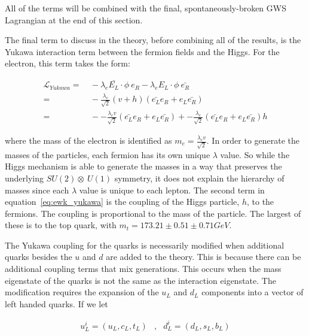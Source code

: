 \noindent All of the terms will be combined with the final,
spontaneously-broken GWS Lagrangian at the end of this section.  

\par The final term to discuss in the theory, before combining all of
the results, is the Yukawa interaction term between the fermion fields
and the Higgs.  For the electron, this term takes the form:

\begin{equation}\label{eq:ewk_yukawa}
\begin{aligned}
\mathcal{L}_{Yukawa} =&~ -\lambda_{e}\bar{E_{L}}\cdot\phi~e_{R} -
\lambda_{e}E_{L}\cdot\phi~\bar{e_{R}} \\
=&~ -\frac{\lambda_{e}}{\sqrt{2}}(v+h)(\bar{e_{L}}e_{R} +
  e_{L}\bar{e_{R}}) \\
=&~ --\frac{\lambda_{e}v}{\sqrt{2}}(\bar{e_{L}}e_{R} +
  e_{L}\bar{e_{R}}) + -\frac{\lambda_{e}}{\sqrt{2}}(\bar{e_{L}}e_{R} +
  e_{L}\bar{e_{R}})h
\end{aligned}
\end{equation}

\noindent where the mass of the electron is identified as $m_{e} =
\frac{\lambda_{e}v}{\sqrt{2}}$.  In order to generate the masses of
the particles, each fermion has its own unique $\lambda$ value.  So
while the Higgs mechanism is able to generate the masses in a way that
preserves the underlying $SU(2)\otimes~U(1)$ symmetry, it does not
explain the hierarchy of masses since each $\lambda$ value is unique
to each lepton.  The second term in equation~\ref{eq:ewk_yukawa} is
the coupling of the Higgs particle, $h$, to the fermions.  The
coupling is proportional to the mass of the particle.  The largest of
these is to the top quark, with $m_{t} = 173.21 \pm 0.51 \pm 0.71 GeV$.

\par The Yukawa coupling for the quarks is necessarily modified when
additional quarks besides the $u$ and $d$ are added to the theory.
This is because there can be additional coupling terms that mix
generations.  This occurs when the mass eigenstate of the quarks is
not the same as the interaction eigenstate.  The modification requires
the expansion of the $u_{L}$ and $d_{L}$ components into a vector of
left handed quarks.  If we let

\begin{equation}\label{eq:ewk_quark_vector}
\begin{aligned}
u_{L}^{i} = (u_{L}, c_{L}, t_{L}) &,                 & d_{L}^{i} = (d_{L}, s_{L}, b_{L})
\end{aligned}
\end{equation}

